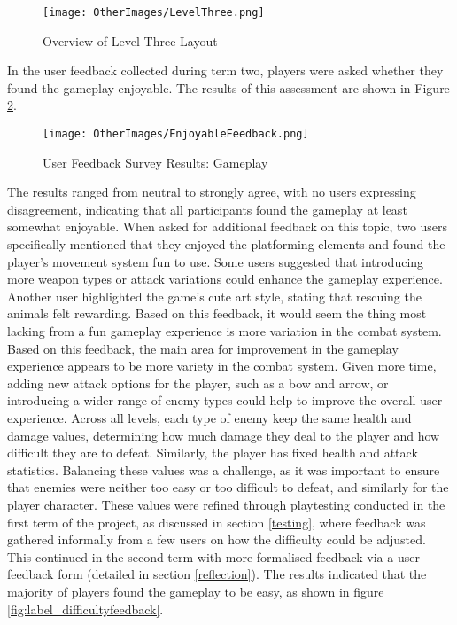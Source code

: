 \documentclass[10pt]{final_report}
\begin{document}
\begin{figure}[H]
    \centering
    \texttt{[image: OtherImages/LevelThree.png]}
    \caption{Overview of Level Three Layout}
    \label{fig:label_LevelThree}
\end{figure}

In the user feedback collected during term two, players were asked whether they found the gameplay enjoyable. The results of this assessment are shown in Figure \ref{fig:label_funfeedback}.
\begin{figure}[H]
    \centering
    \texttt{[image: OtherImages/EnjoyableFeedback.png]}
    \caption{User Feedback Survey Results: Gameplay}
    \label{fig:label_funfeedback}
\end{figure}
The results ranged from neutral to strongly agree, with no users expressing disagreement, indicating that all participants found the gameplay at least somewhat enjoyable. When asked for additional feedback on this topic, two users specifically mentioned that they enjoyed the platforming elements and found the player’s movement system fun to use. Some users suggested that introducing more weapon types or attack variations could enhance the gameplay experience. Another user highlighted the game’s cute art style, stating that rescuing the animals felt rewarding. Based on this feedback, it would seem the thing most lacking from a fun gameplay experience is more variation in the combat system. Based on this feedback, the main area for improvement in the gameplay experience appears to be more variety in the combat system. Given more time, adding new attack options for the player, such as a bow and arrow, or introducing a wider range of enemy types could help to improve the overall user experience. \newline
Across all levels, each type of enemy keep the same health and damage values, determining how much damage they deal to the player and how difficult they are to defeat. Similarly, the player has fixed health and attack statistics. Balancing these values was a challenge, as it was important to ensure that enemies were neither too easy or too difficult to defeat, and similarly for the player character. These values were refined through playtesting conducted in the first term of the project, as discussed in section \ref{testing}, where feedback was gathered informally from a few users on how the difficulty could be adjusted. This continued in the second term with more formalised feedback via a user feedback form (detailed in section \ref{reflection}). The results indicated that the majority of players found the gameplay to be easy, as shown in figure \ref{fig:label_difficultyfeedback}.
\end{document}

